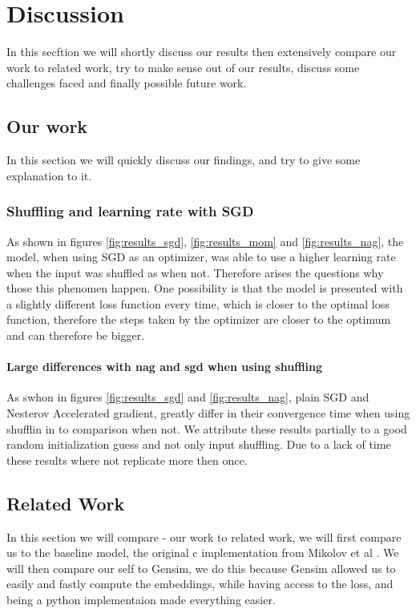 \chapter{Discussion}\label{chap:discussion}



In this secftion we will shortly discuss our results then extensively compare our work to related work, try to make sense out of our results, discuss some challenges faced and finally possible future work. 

\section{Our work}
In this section we will quickly discuss our findings, and try to give some explanation to it.  
\subsection{Shuffling and learning rate with SGD}
As shown in figures \ref{fig:results_sgd}, \ref{fig:results_mom} and \ref{fig:results_nag}, the model, when using SGD as an optimizer,  was able to use a higher learning rate when the input was shuffled as when not. Therefore arises the questions why those this phenomen happen. One possibility is that the model is presented with a slightly different loss function every time, which is closer to the optimal loss function, therefore the steps taken by the optimizer are closer to the optimum and can therefore be bigger. 

\subsubsection{Large differences with nag and sgd when using shuffling}
As swhon in figures \ref{fig:results_sgd} and \ref{fig:results_nag}, plain SGD and Nesterov Accelerated gradient, greatly differ in their convergence time when using shufflin in to comparison when not. We attribute these results partially to a good random initialization guess and not only input shuffling. Due to a lack of time these results where not replicate more then once. 

\section{Related Work}
In this section we will compare - our work to related work, we will first compare us to the baseline model, the original c implementation from Mikolov et al \cite{Mikolov}. We will then compare our self to Gensim, we do this because Gensim allowed us to easily and fastly compute the embeddings, while having access to the loss, and being a python implementaion made everything easier. 

